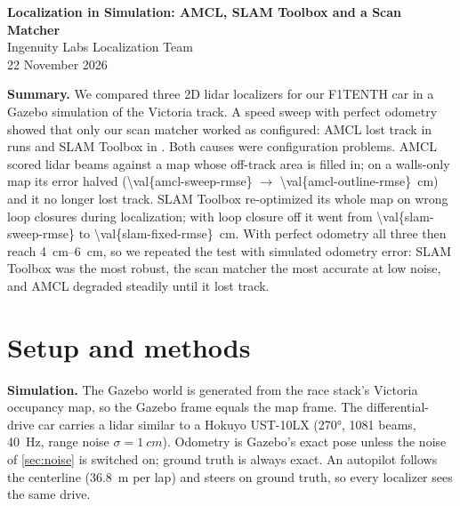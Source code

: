 \documentclass[10pt,letterpaper]{article}
\begin{document}
\begin{center}
  {\LARGE\bfseries Localization in Simulation: AMCL, SLAM Toolbox and a Scan Matcher}\\[5pt]
  {\large Ingenuity Labs Localization Team}\\[2pt]
  {\small\color{ink2}22 November 2026}
\end{center}

\noindent\textbf{Summary.}
We compared three 2D lidar localizers for our F1TENTH car in a Gazebo simulation of the Victoria
track. A speed sweep with perfect odometry showed that only our scan matcher worked as configured:
AMCL lost track in  runs and SLAM Toolbox in . Both causes
were configuration problems. AMCL scored lidar beams against a map whose off-track area is filled
in; on a walls-only map its error halved (\SI{\val{amcl-sweep-rmse}}{} $\to$
\SI{\val{amcl-outline-rmse}}{cm}) and it no longer lost track. SLAM Toolbox re-optimized its whole
map on wrong loop closures during localization; with loop closure off it went from
\SI{\val{slam-sweep-rmse}}{} to \SI{\val{slam-fixed-rmse}}{cm}. With perfect odometry all three then
reach \SIrange{4}{6}{cm}, so we repeated the test with simulated odometry error: SLAM Toolbox was
the most robust, the scan matcher the most accurate at low noise, and AMCL degraded steadily until it
lost track.

\section{Setup and methods}\label{sec:setup}

\textbf{Simulation.} The Gazebo world is generated from the race stack's Victoria occupancy map, so
the Gazebo frame equals the map frame. The differential-drive car carries a lidar similar to a Hokuyo
UST-10LX (\ang{270}, 1081 beams, \SI{40}{Hz}, range noise $\sigma=\SI{1}{cm}$). Odometry is
Gazebo's exact pose unless the noise of \cref{sec:noise} is switched on; ground truth is always
exact. An autopilot follows the centerline (\SI{36.8}{m} per lap) and steers on ground truth, so every
localizer sees the same drive.
\end{document}
